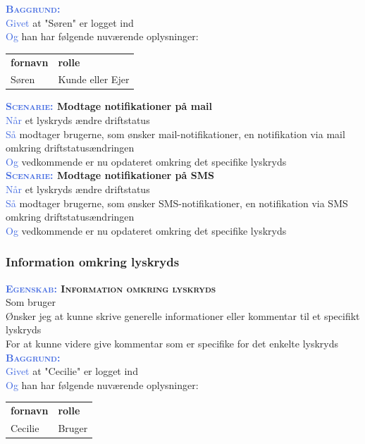 \textsc{\textcolor{RoyalBlue}{\textbf{Baggrund:}}}\\
\textcolor{RoyalBlue}{Givet} at "Søren" er logget ind\\
\textcolor{RoyalBlue}{Og} han har følgende nuværende oplysninger:\\
\begin{tabular}{| l | l |}
	\textbf{fornavn} & \textbf{rolle} \\
	Søren & Kunde eller Ejer\\
\end{tabular}
\newline \newline

\textbf{\textsc{\textcolor{RoyalBlue}{Scenarie:}} Modtage notifikationer på 
	mail}\\
\textcolor{RoyalBlue}{Når} et lyskryds ændre driftstatus\\
\textcolor{RoyalBlue}{Så} modtager brugerne, som ønsker 
mail-notifikationer, en notifikation via mail omkring driftstatusændringen\\
\textcolor{RoyalBlue}{Og} vedkommende er nu opdateret omkring det specifike lyskryds\\

\textbf{\textsc{\textcolor{RoyalBlue}{Scenarie:}} Modtage notifikationer på 
	SMS}\\
\textcolor{RoyalBlue}{Når} et lyskryds ændre driftstatus\\
\textcolor{RoyalBlue}{Så} modtager brugerne, som ønsker SMS-notifikationer, 
en notifikation via SMS omkring driftstatusændringen\\
\textcolor{RoyalBlue}{Og} vedkommende er nu opdateret omkring det specifike 
lyskryds\\

\subsubsection{Information omkring lyskryds}
\textbf{\textsc{\textcolor{RoyalBlue}{Egenskab:} Information omkring lyskryds}}\\
Som bruger\\
Ønsker jeg at kunne skrive generelle informationer eller kommentar til et specifikt lyskryds\\
For at kunne videre give kommentar som er specifike for det enkelte lyskryds\\

\textsc{\textcolor{RoyalBlue}{\textbf{Baggrund:}}}\\
\textcolor{RoyalBlue}{Givet} at "Cecilie" er logget ind\\
\textcolor{RoyalBlue}{Og} han har følgende nuværende oplysninger:\\
\begin{tabular}{| l | l |}
	\textbf{fornavn} & \textbf{rolle} \\
	Cecilie & Bruger\\
\end{tabular}
\newline \newline

